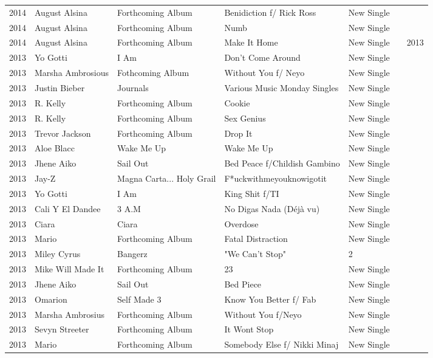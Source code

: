 \documentclass{article}
\begin{document}
\begin{tabular}{lllllll}
2014 & August Alsina & Forthcoming Album & Benidiction f/ Rick Ross & New Single &  &  \\
2014 & August Alsina & Forthcoming Album & Numb & New Single &  &  \\
2014 & August Alsina & Forthcoming Album & Make It Home & New Single &  & 2013 \\
2013 & Yo Gotti & I Am & Don't Come Around & New Single &  &  \\
2013 & Marsha Ambrosious & Fothcoming Album & Without You f/ Neyo & New Single &  &  \\
2013 & Justin Bieber & Journals & Various Music Monday Singles & New Single &  &  \\
2013 & R. Kelly & Forthcoming Album & Cookie & New Single &  &  \\
2013 & R. Kelly & Forthcoming Album & Sex Genius & New Single &  &  \\
2013 & Trevor Jackson & Forthcoming Album & Drop It & New Single &  &  \\
2013 & Aloe Blacc & Wake Me Up & Wake Me Up & New Single &  &  \\
2013 & Jhene Aiko & Sail Out & Bed Peace f/Childish Gambino & New Single &  &  \\
2013 & Jay-Z & Magna Carta... Holy Grail & F*uckwithmeyouknowigotit & New Single &  &  \\
2013 & Yo Gotti & I Am & King Shit f/TI & New Single &  &  \\
2013 & Cali Y El Dandee & 3 A.M & No Digas Nada (Déjà vu) & New Single &  &  \\
2013 & Ciara & Ciara & Overdose & New Single &  &  \\
2013 & Mario & Forthcoming Album & Fatal Distraction & New Single &  &  \\
2013 & Miley Cyrus & Bangerz & "We Can't Stop" & 2 &  &  \\
2013 & Mike Will Made It & Forthcoming Album & 23 & New Single &  &  \\
2013 & Jhene Aiko & Sail Out & Bed Piece & New Single &  &  \\
2013 & Omarion & Self Made 3 & Know You Better f/ Fab & New Single &  &  \\
2013 & Marsha Ambrosius & Forthcoming Album & Without You f/Neyo & New Single &  &  \\
2013 & Sevyn Streeter & Forthcoming Album & It Wont Stop & New Single &  &  \\
2013 & Mario & Forthcoming Album & Somebody Else f/ Nikki Minaj & New Single &  &  \\

\end{tabular}
\end{document}
